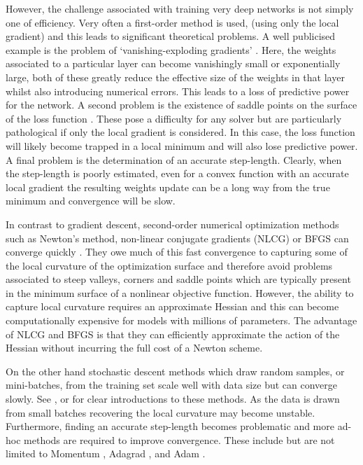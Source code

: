 \documentclass[11pt,twocolumn]{article}
\begin{document}
However, the challenge associated with training very deep networks is not simply one of efficiency. Very often a first-order method is used, (using only the local gradient) and this leads to significant theoretical problems. A well publicised example is the problem of `vanishing-exploding gradients' \citep[see][]{Huang:Stoch}. Here, the weights associated to a particular layer can become vanishingly small or exponentially large, both of these greatly reduce the effective size of the weights in that layer whilst also introducing numerical errors. This leads to a loss of predictive power for the network. A second problem is the existence of saddle points on the surface of the loss function \citep[see][]{Martens:Deep}. These pose a difficulty for any solver but are particularly pathological if only the local gradient is considered. In this case, the loss function will likely become trapped in a local minimum and will also lose predictive power. A final problem is the determination of an accurate step-length. Clearly, when the step-length is poorly estimated, even for a convex function with an accurate local gradient the resulting weights update can be a long way from the true minimum and convergence will be slow.  
   
In contrast to gradient descent, second-order numerical optimization methods such as Newton's method, non-linear conjugate gradients (NLCG) or BFGS can converge quickly \citep[see][]{Nocedal:Wright}. They owe much of this fast convergence to capturing some of the local curvature of the optimization surface and therefore avoid problems associated to steep valleys, corners and saddle points which are typically present in the minimum surface of a nonlinear objective function. However, the ability to capture local curvature requires an approximate Hessian and this can become computationally expensive for models with millions of parameters. The advantage of NLCG and BFGS is that they can efficiently approximate the action of the Hessian without incurring the full cost of a Newton scheme.

On the other hand stochastic descent methods which draw random samples, or mini-batches, from the training set scale well with data size but can converge slowly. See \citet{Goodfellow-et-al-2016}, \citet{Hinton:SGD} or \citet{Ruder:Overview} for clear introductions to these methods. As the data is drawn from small batches recovering the local curvature may become unstable. Furthermore, finding an accurate step-length becomes problematic and more ad-hoc methods are required to improve convergence. These include but are not limited to Momentum \cite{Momentum:Qian}, Adagrad \cite{adagrad:Duchi}, and Adam \cite{adam:Kingma}.
\end{document}
